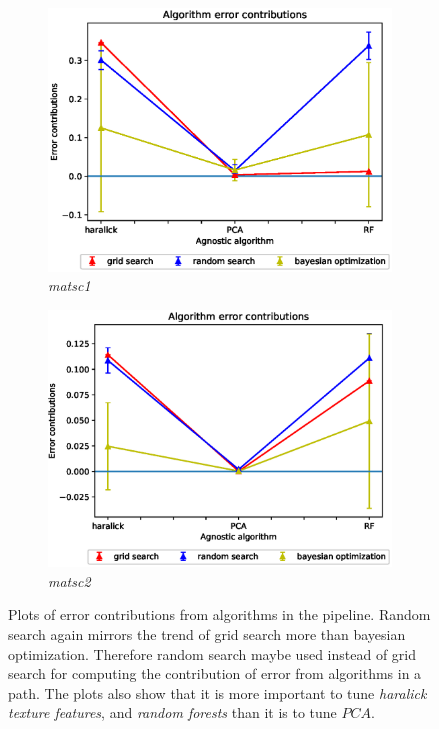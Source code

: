 \begin{figure}[ht!]
\begin{subfigure}{.5\textwidth}
  \centering
  \includegraphics[scale=0.37]{img/EP/agnostic_error_alg_matsc_dataset1.eps}
  \caption{\textit{matsc1}}
  \label{fig:sfig3}
\end{subfigure}%
\begin{subfigure}{.5\textwidth}
  \centering
  \includegraphics[scale=0.37]{img/EP/agnostic_error_alg_matsc_dataset2.eps}
  \caption{\textit{matsc2}}
  \label{fig:sfig4}
\end{subfigure}

\caption{Plots of error contributions from algorithms in the pipeline. Random search again mirrors the trend of grid search more than bayesian optimization. Therefore random search maybe used instead of grid search for computing the contribution of error from algorithms in a path. The plots also show that it is more important to tune \textit{haralick texture features}, and \textit{random forests} than it is to tune  $PCA$. }
\label{fig:fig}
\end{figure}

